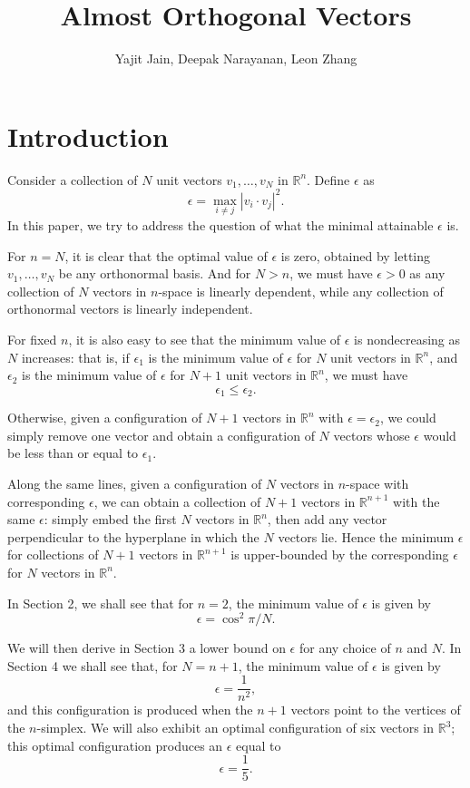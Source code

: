 \documentclass[11pt,letterpaper,twoside,english]{article}
\title{Almost Orthogonal Vectors}
\author{Yajit Jain, Deepak Narayanan, Leon Zhang}
\theoremstyle{theorem}
\theoremstyle{remark}
\begin{document}
\maketitle

\section{Introduction}
Consider a collection of $N$ unit vectors $v_1, \ldots, v_N$ in $\mathbb R^n$. Define $\epsilon$ as
\[\epsilon=\max_{i\neq j}|v_i\cdot v_j|^2.\]
In this paper, we try to address the question of what the minimal attainable $\epsilon$ is.

For $n=N$, it is clear that the optimal value of $\epsilon$ is zero, obtained by letting $v_1,\ldots, v_N$ be any orthonormal basis. And for $N>n$, we must have $\epsilon>0$ as any collection of $N$ vectors in $n$-space is linearly dependent, while any collection of orthonormal vectors is linearly independent. 

For fixed $n$, it is also easy to see that the minimum value of $\epsilon$ is nondecreasing as $N$ increases: that is, if $\epsilon_1$ is the minimum value of $\epsilon$ for $N$ unit vectors in $\mathbb R^n$, and $\epsilon_2$ is the minimum value of $\epsilon$ for $N+1$ unit vectors in $\mathbb R^n$, we must have 
\[\epsilon_1\leq \epsilon_2.\] 

Otherwise, given a configuration of $N+1$ vectors in $\mathbb R^n$ with $\epsilon=\epsilon_2$, we could simply remove one vector and obtain a configuration of $N$ vectors whose $\epsilon$ would be less than or equal to $\epsilon_1$.

Along the same lines, given a configuration of $N$ vectors in $n$-space with corresponding $\epsilon$, we can obtain a collection of $N+1$ vectors in $\mathbb R^{n+1}$ with the same $\epsilon$: simply embed the first $N$ vectors in $\mathbb R^{n}$, then add any vector perpendicular to the hyperplane in which the $N$ vectors lie. Hence the minimum $\epsilon$ for collections of $N+1$ vectors in $\mathbb R^{n+1}$ is upper-bounded by the corresponding $\epsilon$ for $N$ vectors in $\mathbb R^n$.

In Section 2, we shall see that for $n=2$, the minimum value of $\epsilon$ is given by 
\[\epsilon=\cos^2\pi/N.\] 

We will then derive in Section 3 a lower bound on $\epsilon$ for any choice of $n$ and $N$. In Section 4 we shall see that, for $N=n+1$, the minimum value of $\epsilon$ is given by
\[\epsilon=\frac{1}{n^2},\] 
and this configuration is produced when the $n+1$ vectors point to the vertices of the $n$-simplex. We will also exhibit an optimal configuration of six vectors in $\mathbb R^3$; this optimal configuration produces an $\epsilon$ equal to
\[\epsilon=\frac 1 5.\]
\end{document}
